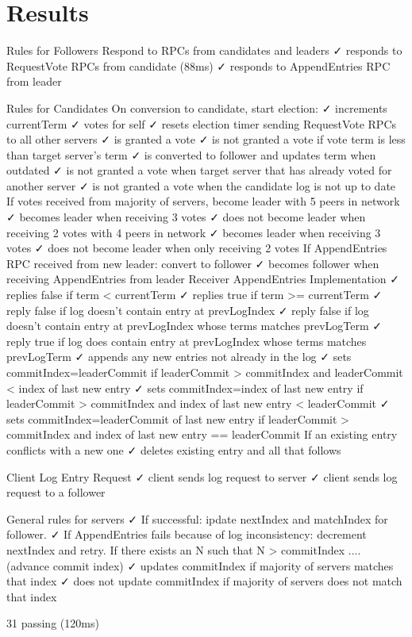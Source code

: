 \section{Results}
\label{sec:results}
\begin{small}
\begin{spverbatim}


  Rules for Followers
    Respond to RPCs from candidates and leaders
      ✓ responds to RequestVote RPCs from candidate (88ms)
      ✓ responds to AppendEntries RPC from leader 

  Rules for Candidates
    On conversion to candidate, start election:
      ✓ increments currentTerm 
      ✓ votes for self 
      ✓ resets election timer 
      sending RequestVote RPCs to all other servers
        ✓ is granted a vote 
        ✓ is not granted a vote if vote term is less than target server's term 
        ✓ is converted to follower and updates term when outdated 
        ✓ is not granted a vote when target server that has already voted for another server 
        ✓ is not granted a vote when the candidate log is not up to date 
    If votes received from majority of servers, become leader
      with 5 peers in network
        ✓ becomes leader when receiving 3 votes 
        ✓ does not become leader when receiving 2 votes 
      with 4 peers in network
        ✓ becomes leader when receiving 3 votes 
        ✓ does not become leader when only receiving 2 votes 
    If AppendEntries RPC received from new leader: convert to follower
      ✓ becomes follower when receiving AppendEntries from leader 
    Receiver AppendEntries Implementation
      ✓ replies false if term < currentTerm 
      ✓ replies true if term >= currentTerm 
      ✓ reply false if log doesn't contain entry at prevLogIndex 
      ✓ reply false if log doesn't contain entry at prevLogIndex whose terms matches prevLogTerm 
      ✓ reply true if log does contain entry at prevLogIndex whose terms matches prevLogTerm 
      ✓ appends any new entries not already in the log 
      ✓ sets commitIndex=leaderCommit if leaderCommit > commitIndex and leaderCommit < index of last new entry 
      ✓ sets commitIndex=index of last new entry if leaderCommit > commitIndex and index of last new entry < leaderCommit 
      ✓ sets commitIndex=leaderCommit of last new entry if leaderCommit > commitIndex and index of last new entry == leaderCommit 
      If an existing entry conflicts with a new one
        ✓ deletes existing entry and all that follows 

  Client Log Entry Request
    ✓ client sends log request to server 
    ✓ client sends log request to a follower 

  General rules for servers
    ✓ If successful: ipdate nextIndex and matchIndex for follower. 
    ✓ If AppendEntries fails because of log inconsistency: decrement nextIndex and retry. 
    If there exists an N such that N > commitIndex .... (advance commit index)
      ✓ updates commitIndex if majority of servers matches that index 
      ✓ does not update commitIndex if majority of servers does not match that index 


  31 passing (120ms)


\end{spverbatim}
\end{small}
